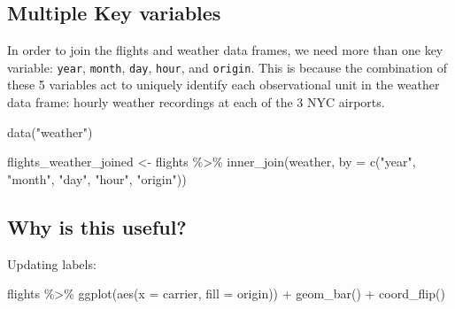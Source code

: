\documentclass[
  letterpaper,
  DIV=11,
  numbers=noendperiod]{scrartcl}
\newenvironment{Shaded}{\begin{snugshade}}{\end{snugshade}}
\newcommand{\AttributeTok}[1]{\textcolor[rgb]{0.40,0.45,0.13}{#1}}
\newcommand{\FunctionTok}[1]{\textcolor[rgb]{0.28,0.35,0.67}{#1}}
\newcommand{\NormalTok}[1]{\textcolor[rgb]{0.00,0.23,0.31}{#1}}
\newcommand{\OtherTok}[1]{\textcolor[rgb]{0.00,0.23,0.31}{#1}}
\newcommand{\SpecialCharTok}[1]{\textcolor[rgb]{0.37,0.37,0.37}{#1}}
\newcommand{\StringTok}[1]{\textcolor[rgb]{0.13,0.47,0.30}{#1}}
\begin{document}
\hypertarget{multiple-key-variables}{%
\subsection{Multiple Key variables}\label{multiple-key-variables}}

In order to join the flights and weather data frames, we need more than
one key variable: \texttt{year}, \texttt{month}, \texttt{day},
\texttt{hour}, and \texttt{origin}. This is because the combination of
these 5 variables act to uniquely identify each observational unit in
the weather data frame: hourly weather recordings at each of the 3 NYC
airports.

\begin{Shaded}
\begin{Highlighting}[]
\FunctionTok{data}\NormalTok{(}\StringTok{"weather"}\NormalTok{)}
\end{Highlighting}
\end{Shaded}

\begin{Shaded}
\begin{Highlighting}[]
\NormalTok{flights\_weather\_joined }\OtherTok{\textless{}{-}}\NormalTok{ flights }\SpecialCharTok{\%\textgreater{}\%}
  \FunctionTok{inner\_join}\NormalTok{(weather, }\AttributeTok{by =} \FunctionTok{c}\NormalTok{(}\StringTok{"year"}\NormalTok{, }\StringTok{"month"}\NormalTok{, }\StringTok{"day"}\NormalTok{, }\StringTok{"hour"}\NormalTok{, }\StringTok{"origin"}\NormalTok{))}
\end{Highlighting}
\end{Shaded}

\hypertarget{why-is-this-useful}{%
\subsection{Why is this useful?}\label{why-is-this-useful}}

Updating labels:

\begin{Shaded}
\begin{Highlighting}[]
\NormalTok{flights }\SpecialCharTok{\%\textgreater{}\%} 
\FunctionTok{ggplot}\NormalTok{(}\FunctionTok{aes}\NormalTok{(}\AttributeTok{x =}\NormalTok{ carrier, }\AttributeTok{fill =}\NormalTok{ origin)) }\SpecialCharTok{+}
  \FunctionTok{geom\_bar}\NormalTok{() }\SpecialCharTok{+} 
  \FunctionTok{coord\_flip}\NormalTok{()}
\end{Highlighting}
\end{Shaded}
\end{document}
